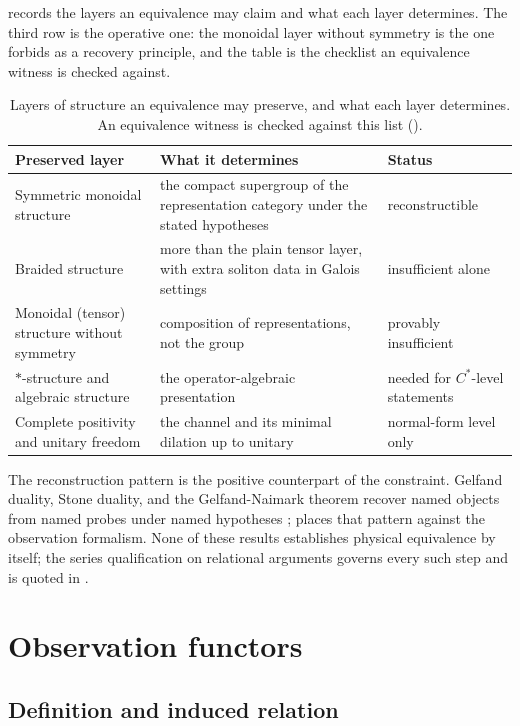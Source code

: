 \documentclass[11pt,letterpaper]{article}
\theoremstyle{definition}
\theoremstyle{remark}
\begin{document}
 records the layers an equivalence may claim and what each layer determines. The third row is the operative one: the monoidal layer without symmetry is the one  forbids as a recovery principle, and the table is the checklist an equivalence witness is checked against.

\begin{table}[t]
\centering
\small
\begin{tabularx}{\textwidth}{@{} L{0.26\textwidth} X L{0.26\textwidth} @{}}
\toprule
Preserved layer & What it determines & Status \\
\midrule
Symmetric monoidal structure & the compact supergroup of the representation category under the stated hypotheses & reconstructible \\
Braided structure & more than the plain tensor layer, with extra soliton data in Galois settings & insufficient alone \\
Monoidal (tensor) structure without symmetry & composition of representations, not the group & provably insufficient \\
$*$-structure and algebraic structure & the operator-algebraic presentation & needed for $C^*$-level statements \\
Complete positivity and unitary freedom & the channel and its minimal dilation up to unitary & normal-form level only \\
\bottomrule
\end{tabularx}
\caption{Layers of structure an equivalence may preserve, and what each layer determines. An equivalence witness is checked against this list ().}
\label{tab:layers}
\end{table}

The reconstruction pattern is the positive counterpart of the constraint. Gelfand duality, Stone duality, and the Gelfand-Naimark theorem recover named objects from named probes under named hypotheses \cite{b3,b4,b6};  places that pattern against the observation formalism. None of these results establishes physical equivalence by itself; the series qualification on relational arguments governs every such step and is quoted in .

\section{Observation functors}
\label{sec:functors}

\subsection{Definition and induced relation}
\end{document}
